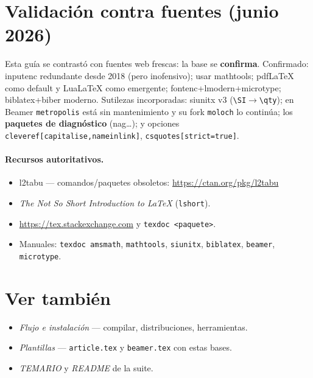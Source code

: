 \documentclass[11pt,a4paper]{article}
\newcommand{\C}[1]{\texttt{\textbackslash #1}}
\newcommand{\pkg}[1]{\textsf{#1}}
\begin{document}
\section{Validación contra fuentes (junio 2026)}
Esta guía se contrastó con fuentes web frescas: la base se \textbf{confirma}.
Confirmado: \pkg{inputenc} redundante desde 2018 (pero inofensivo); usar
\pkg{mathtools}; pdfLaTeX como default y LuaLaTeX como emergente;
\pkg{fontenc}+\pkg{lmodern}+\pkg{microtype}; \pkg{biblatex}+biber moderno.
Sutilezas incorporadas: \pkg{siunitx} v3 (\C{SI}$\to$\C{qty}); en Beamer
\texttt{metropolis} está sin mantenimiento y su fork \texttt{moloch} lo continúa;
los \textbf{paquetes de diagnóstico} (\pkg{nag}\dots); y opciones
\texttt{cleveref[capitalise,nameinlink]}, \texttt{csquotes[strict=true]}.

\paragraph{Recursos autoritativos.}
\begin{itemize}[noitemsep,leftmargin=*]
  \item \pkg{l2tabu} — comandos/paquetes obsoletos: \url{https://ctan.org/pkg/l2tabu}
  \item \emph{The Not So Short Introduction to LaTeX} (\texttt{lshort}).
  \item \url{https://tex.stackexchange.com} y \texttt{texdoc <paquete>}.
  \item Manuales: \texttt{texdoc amsmath}, \texttt{mathtools}, \texttt{siunitx},
        \texttt{biblatex}, \texttt{beamer}, \texttt{microtype}.
\end{itemize}

\section*{Ver también}
\begin{itemize}[noitemsep,leftmargin=*]
  \item \emph{Flujo e instalación} — compilar, distribuciones, herramientas.
  \item \emph{Plantillas} — \texttt{article.tex} y \texttt{beamer.tex} con estas bases.
  \item \emph{TEMARIO} y \emph{README} de la suite.
\end{itemize}
\end{document}
